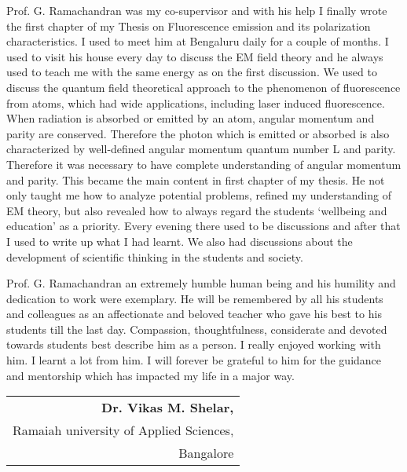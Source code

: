 \medskip

 Prof. G. Ramachandran was my co-supervisor and with his help I finally wrote the first chapter of my Thesis on Fluorescence emission and its polarization characteristics. I used to meet him at Bengaluru daily for a couple of months. I used to visit his house every day to discuss the EM field theory and he always used to teach me  with the same energy as on the first discussion. We used to discuss the quantum field theoretical approach to the phenomenon of fluorescence from atoms, which had wide applications, including laser induced fluorescence. When radiation is absorbed or emitted by an atom, angular momentum and parity are conserved. Therefore the photon which is emitted or absorbed is also characterized by well-defined angular momentum quantum number L and parity. Therefore it was necessary to have complete understanding of angular momentum and parity. This became the main content in first chapter of my thesis. He not only taught me how to analyze potential problems, refined my understanding of EM theory, but also revealed how to always regard the students `wellbeing and education' as a priority. Every evening there used to be discussions and after that I used to write up what I had learnt. We also had discussions about the development of scientific thinking in the students and society.

\medskip

Prof. G. Ramachandran an extremely humble human being and his humility and dedication to work were exemplary. He will be remembered by all his students and colleagues as an affectionate and beloved teacher who gave his best to his students till the last day. Compassion, thoughtfulness, considerate and devoted towards students best describe him as a person. I really enjoyed working with him. I learnt a lot from him. I will forever be grateful to him for the guidance and mentorship which has impacted my life in a major way.

\begin{flushright}
\begin{tabular}{r@{}}
\textbf{Dr. Vikas M. Shelar,}\\
Ramaiah university of Applied Sciences,\\
Bangalore
\end{tabular}
\end{flushright}\relax
